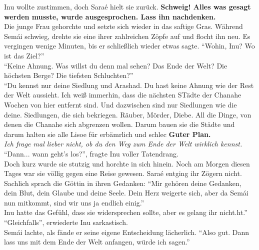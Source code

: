 Inu wollte zustimmen, doch Saraé hielt sie zurück. \textbf{Schweig! Alles was gesagt werden musste, 
wurde ausgesprochen. Lass ihn nachdenken.}\\
Die junge Frau gehorchte und setzte sich wieder in das saftige Gras. Während Semái schwieg, drehte 
sie eine ihrer zahlreichen Zöpfe auf und flocht ihn neu. Es vergingen wenige Minuten, bis er 
schließlich wieder etwas sagte. ``Wohin, Inu? Wo ist das Ziel?''\\
``Keine Ahnung. Was willst du denn mal sehen? Das Ende der Welt? Die höchsten Berge? Die tiefsten 
Schluchten?''\\
``Du kennst nur deine Siedlung und Arashad. Du hast keine Ahnung wie der Rest der Welt aussieht. 
Ich weiß immerhin, dass die nächsten STädte der Chanahe Wochen von hier entfernt sind. Und 
dazwischen sind nur Siedlungen wie die deine. Siedlungen, die sich bekriegen. Räuber, Mörder, 
Diebe. All die Dinge, von denen die Chanahe sich abgrenzen wollen. Darum bauen sie die Städte und 
darum halten sie alle Lisoe für erbämrlich und schlec
\textbf{Guter Plan.}\\
\textit{Ich frage mal lieber nicht, ob du den Weg zum Ende der Welt wirklich kennst.}\\
``Dann... wann geht's los?'', fragte Inu voller Tatendrang.\\
Doch kurz wurde sie stutzig und horchte in sich hinein. Noch am Morgen diesen Tages war sie völlig 
gegen eine Reise gewesen. Saraé entging ihr Zögern nicht. Sachlich sprach die Göttin in ihren 
Gedanken: ``Mir gehören deine Gedanken, dein Blut, dein Glaube und deine Seele. Dein Herz weigerte 
sich, aber da Semái nun mitkommt, sind wir uns ja endlich einig.''\\
Inu hatte das Gefühl, dass sie widersprechen sollte, aber es gelang ihr nicht.ht.''\\
``Gleichfalls'', erwiederte Inu sarkastisch.\\
Semái lachte, als fände er seine eigene Entscheidung lächerlich. ``Also gut. Dann lass uns mit dem 
Ende der Welt anfangen, würde ich sagen.''\\
